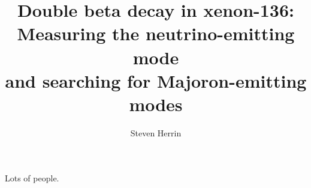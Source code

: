 \documentclass[12pt,twoside]{report}
\begin{document}
\title{Double beta decay in xenon-136:\\
	 Measuring the neutrino-emitting mode\\
	 and searching for Majoron-emitting modes}
\author{Steven Herrin}
 
\beforepreface



Lots of people.

\afterpreface
 


















\appendix




\printbibliography

\onlinesignature
\end{document}

